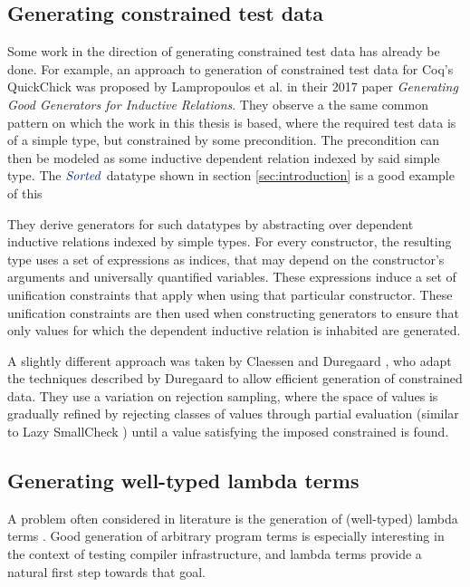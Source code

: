 \documentclass[a4paper,msc,twosized=semi]{uustthesis}
\newcommand*{\mathcolor}{}
\def\mathcolor#1#{\mathcoloraux{#1}}
\newcommand*{\mathcoloraux}[3]{%
  \protect\leavevmode
  \begingroup
    \color#1{#2}#3%
  \endgroup
}
\newcommand{\HSCon}[1]{\mathcolor{hsblue3}{\mathit{#1}}}
\begin{document}
\subsection{Generating constrained test data}

  Some work in the direction of generating constrained test data has already be done. 
  For example, an approach to generation of constrained test data for Coq's QuickChick 
  was proposed by Lampropoulos et al. \cite{lampropoulos2017generating} in their 2017 
  paper \textit{Generating Good Generators for Inductive Relations}. They observe a 
  the same common pattern on which the work in this thesis is based, where the required 
  test data is of a simple type, but constrained by some precondition. The precondition 
  can then be modeled as some inductive dependent relation indexed by said simple type. 
  The \ensuremath{\HSCon{Sorted}} datatype shown in section \ref{sec:introduction} is a good example of 
  this

  They derive generators for such datatypes by abstracting over dependent inductive 
  relations indexed by simple types. For every constructor, the resulting type uses a 
  set of expressions as indices, that may depend on the constructor's arguments and 
  universally quantified variables. These expressions induce a set of unification 
  constraints that apply when using that particular constructor. These unification 
  constraints are then used when constructing generators to ensure that only values 
  for which the dependent inductive relation is inhabited are generated. 

  A slightly different approach was taken by Claessen and Duregaard 
  \cite{claessen2015generating}, who adapt the techniques described 
  by Duregaard \cite{duregaard2013feat} to allow efficient generation of constrained 
   data. They use a variation on rejection sampling, where the space of values is 
  gradually refined by rejecting classes of values through partial evaluation 
  (similar to Lazy SmallCheck \cite{runciman2008smallcheck}) until a value satisfying 
  the imposed constrained is found. 

\subsection{Generating well-typed lambda terms}

  A problem often considered in literature is the generation of (well-typed) lambda 
  terms \cite{palka2011testing, grygiel2013counting, claessen2015generating}. Good 
  generation of arbitrary program terms is especially interesting in the context of 
  testing compiler infrastructure, and lambda terms provide a natural first step 
  towards that goal. 
\end{document}
